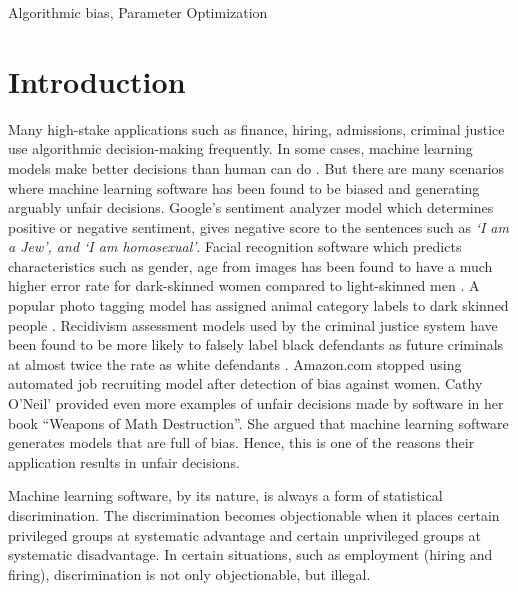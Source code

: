 \documentclass[10pt,conference]{IEEEtran}
\begin{document}
\begin{IEEEkeywords}
Algorithmic bias, Parameter Optimization
\end{IEEEkeywords}

\section{Introduction}
Many high-stake applications such as finance, hiring, admissions, criminal justice use algorithmic decision-making frequently. In some cases, machine learning models make better decisions than human can do \cite{Brun:2018:SF:3236024.3264838,Aydemir:2018:RES:3194770.3194778}. But there are many scenarios where machine learning software has been found to be biased and generating arguably unfair decisions. Google's sentiment analyzer model which determines positive or negative sentiment, gives negative score to the sentences such as \textit{`I am a Jew', and `I am homosexual'}\cite{Google_Sentiment}. Facial recognition software which predicts characteristics such as gender, age from images has been found to have a much higher error rate for dark-skinned women compared to light-skinned men \cite{Gender_Bias}. A popular photo tagging model has assigned animal category labels to dark skinned people \cite{Google_Photo}. Recidivism assessment models used by the criminal justice system have been found to be more likely to falsely label black defendants as future criminals at almost twice the rate as white defendants \cite{Machine_Bias}. Amazon.com stopped using automated job recruiting model after detection of bias against women\cite{Amazon_Bias}. Cathy O'Neil’ provided even more examples of unfair decisions made by software in her book ``Weapons of Math Destruction''\cite{O'Neil:2016:WMD:3002861}. She argued that machine learning software generates models that are full of bias. Hence, this is one of the reasons their application results in unfair decisions.


Machine learning software, by its nature, is always a form of statistical discrimination. The discrimination becomes objectionable when it places certain privileged groups at systematic advantage and certain unprivileged groups at systematic disadvantage. In certain situations, such as employment (hiring and firing), discrimination is not only objectionable, but illegal.
\end{document}
